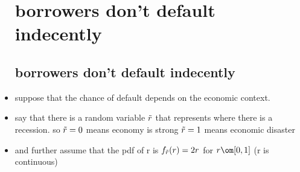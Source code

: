 \documentclass{article}
\begin{document}
\begin{itemize}
\section{borrowers don't default indecently}
\subsection{borrowers don't default indecently}
\item suppose that the chance of default depends on the economic context.
\item say that there is a random variable $\Tilde{r}$ that represents where there is a recession. so $\Tilde{r}=0$ means economy is strong $\Tilde{r}=1$ means economic disaster
\item and further assume that the pdf of r is $f_{\Tilde{r}}(r)=2r$ for $r\om[0,1]$ (r is continuous)


\end{itemize}
\end{document}
